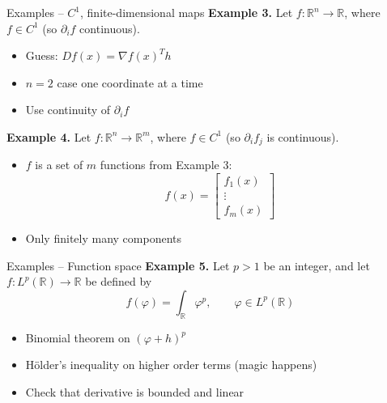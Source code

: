 \documentclass[]{beamer}
\begin{document}
	\begin{frame}{Examples -- $C^1$, finite-dimensional maps}
		\textbf{Example 3.} Let $f : \mathbb{R}^n \to \mathbb{R}$, where $f \in C^1$ (so $\partial_i f$ continuous).
		\begin{itemize}
			\item Guess: $Df(x) = \nabla f(x)^T h$
			\item $n = 2$ case one coordinate at a time
			\item Use continuity of $\partial_i f$
		\end{itemize}
		\vfill
		
		\textbf{Example 4.} Let $f: \mathbb{R}^n \to \mathbb{R}^m$, where $f \in C^1$ (so $\partial_i f_j$ is continuous). 
		\begin{itemize}
			\item $f$ is a set of $m$ functions from Example 3:
			\begin{equation*}
				f(x) = \left[\begin{matrix}
					f_1(x) \\ \vdots \\ f_m(x)
				\end{matrix}\right]
			\end{equation*}
			\item Only finitely many components
		\end{itemize}
	\end{frame}
	
	\begin{frame}{Examples -- Function space}
		\textbf{Example 5.} Let $p > 1$ be an integer, and let $f : L^p(\mathbb{R}) \to \mathbb{R}$ be defined by
		\begin{equation*}
			f(\varphi) = \int_\mathbb{R} \varphi^p, \qquad \varphi \in L^p(\mathbb{R})
		\end{equation*}
		\begin{itemize}
			\item Binomial theorem on $(\varphi + h)^p$
			\item Hölder's inequality on higher order terms (magic happens)
			\item Check that derivative is bounded and linear
		\end{itemize}
	\end{frame}
	
\end{document}
